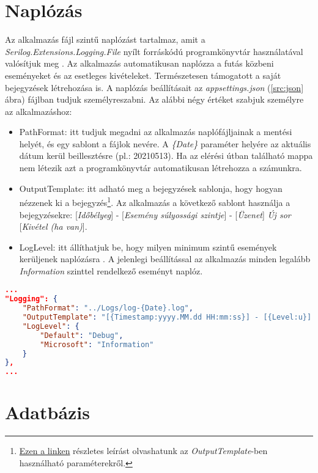 \section{Naplózás}
\label{sec:log}
Az alkalmazás fájl szintű naplózást tartalmaz, amit a \emph{Serilog.Extensions.Logging.File} nyílt forráskódú programkönyvtár használatával valósítjuk meg \cite{SERILOG}. Az alkalmazás automatikusan naplózza a futás közbeni eseményeket és az esetleges kivételeket. Természetesen támogatott a saját bejegyzések létrehozása is. A naplózás beállításait az \emph{appsettings.json} (\ref{src:json} ábra) fájlban tudjuk személyreszabni. Az alábbi négy értéket szabjuk személyre az alkalmazáshoz:
\begin{itemize}
	\item PathFormat: itt tudjuk megadni az alkalmazás naplófájljainak a mentési helyét, és egy sablont a fájlok nevére. A \emph{\{Date\}} paraméter helyére az aktuális dátum kerül beillesztésre (pl.: 20210513). Ha az elérési útban található mappa nem létezik azt a programkönyvtár automatikusan létrehozza a számunkra.
	\item OutputTemplate: itt adható meg a bejegyzések sablonja, hogy hogyan nézzenek ki a bejegyzés\footnote{\href{https://github.com/serilog/serilog/wiki/Formatting-Output}{Ezen a linken} részletes leírást olvashatunk az \emph{OutputTemplate}-ben használható paraméterekről.}. Az alkalmazás a következő sablont használja a bejegyzésekre: [\emph{Időbélyeg}] - [\emph{Esemény súlyossági szintje}] - [\emph{Üzenet}] \emph{Új sor} [\emph{Kivétel (ha van)}].
	\item LogLevel: itt állíthatjuk be, hogy milyen minimum szintű események kerüljenek naplózásra \cite{LogLevels}. A jelenlegi beállítással az alkalmazás minden legalább \emph{Information} szinttel rendelkező eseményt naplóz.
\end{itemize}
\newpage
{}
\begin{lstlisting}[language=json]
...
"Logging": {
	"PathFormat": "../Logs/log-{Date}.log",
	"OutputTemplate": "[{Timestamp:yyyy.MM.dd HH:mm:ss}] - [{Level:u}] - {Message}{NewLine}{Exception}",
	"LogLevel": {
		"Default": "Debug",
		"Microsoft": "Information"
	}
},
...
\end{lstlisting}
\section{Adatbázis}
\label{sec:database}
